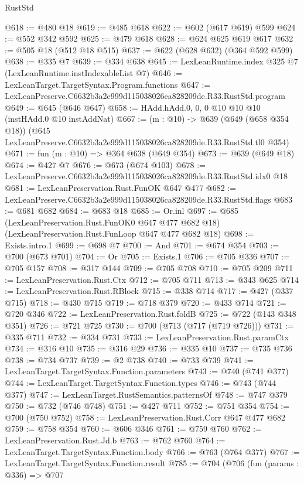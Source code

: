 \begin{lexlean}{RustStd}
\begin{coremodule}
@618 := @480 @18
@619 := @485 @618
@622 := @602 (@617 @619) @599
@624 := @552 @342 @592
@625 := @479 @618
@628 := @624 @625 @619 @617
@632 := @505 @18 (@512 @18 @515)
@637 := @622 (@628 @632) (@364 @592 @599)
@638 := @335 @7
@639 := @334 @638
@645 := LexLeanRuntime.index @325 @7 (LexLeanRuntime.instIndexableList @7)
@646 := LexLeanTarget.TargetSyntax.Program.functions
@647 := LexLeanPreserve.C6632b3a2e999d115038026ca828209de.R33.RustStd.program
@649 := @645 (@646 @647)
@658 := HAdd.hAdd.{0, 0, 0} @10 @10 @10 (instHAdd.{0} @10 instAddNat)
@667 := (m : @10) ->
  @639
    (@649 (@658 @354 @18))
    (@645 LexLeanPreserve.C6632b3a2e999d115038026ca828209de.R33.RustStd.tl0 @354)
@671 := fun (m : @10) => @364 @638 (@649 @354)
@673 := @639 (@649 @18)
@674 := @427 @7
@676 := @673 (@674 @103)
@678 := LexLeanPreserve.C6632b3a2e999d115038026ca828209de.R33.RustStd.idx0 @18
@681 := LexLeanPreservation.Rust.FunOK @647 @477
@682 := LexLeanPreserve.C6632b3a2e999d115038026ca828209de.R33.RustStd.flags
@683 := @681 @682
@684 := @683 @18
@685 := Or.inl
@697 := @685
    (LexLeanPreservation.Rust.FunOK0 @647 @477 @682 @18)
    (LexLeanPreservation.Rust.FunLoop @647 @477 @682 @18)
@698 := Exists.intro.{1}
@699 := @698 @7
@700 := And
@701 := @674 @354
@703 := @700 (@673 @701)
@704 := Or
@705 := Exists.{1}
@706 := @705 @336
@707 := @705 @157
@708 := @317 @144
@709 := @705 @708
@710 := @705 @209
@711 := LexLeanPreservation.Rust.Ctx
@712 := @705 @711
@713 := @343 @625
@714 := LexLeanPreservation.Rust.RBlock
@715 := @338 @714
@717 := @427 (@337 @715)
@718 := @430 @715
@719 := @718 @379
@720 := @433 @714
@721 := @720 @346
@722 := LexLeanPreservation.Rust.foldB
@725 := @722 (@143 @348 @351)
@726 := @721 @725
@730 := @700 (@713 (@717 (@719 @726)))
@731 := @335 @711
@732 := @334 @731
@733 := LexLeanPreservation.Rust.paramCtx
@734 := @316 @10
@735 := @316 @29
@736 := @335 @10
@737 := @735 @736
@738 := @734 @737
@739 := @2 @738
@740 := @733 @739
@741 := LexLeanTarget.TargetSyntax.Function.parameters
@743 := @740 (@741 @377)
@744 := LexLeanTarget.TargetSyntax.Function.types
@746 := @743 (@744 @377)
@747 := LexLeanTarget.RustSemantics.patternsOf
@748 := @747 @379
@750 := @732 (@746 @748)
@751 := @427 @711
@752 := @751 @354
@754 := @700 (@750 @752)
@758 := LexLeanPreservation.Rust.Corr @647 @477 @682
@759 := @758 @354
@760 := @606 @346
@761 := @759 @760
@762 := LexLeanPreservation.Rust.Jd.b
@763 := @762 @760
@764 := LexLeanTarget.TargetSyntax.Function.body
@766 := @763 (@764 @377)
@767 := LexLeanTarget.TargetSyntax.Function.result
@785 := @704
    (@706
      (fun (params : @336) =>
      @707

\end{coremodule}
\end{lexlean}
